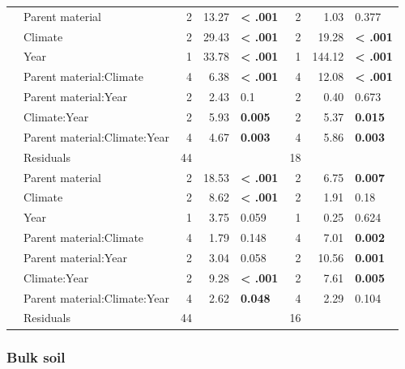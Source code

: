 \documentclass[english,man,floatsintext]{apa6}
\begin{document}
\begin{longtable}[t]{llrrlrrl}
\endfoot
\bottomrule
\endlastfoot
 & Parent material & 2 & 13.27 & \textbf{< .001} & 2 & 1.03 & 0.377\\
\nopagebreak
 & Climate & 2 & 29.43 & \textbf{< .001} & 2 & 19.28 & \textbf{< .001}\\
\nopagebreak
 & Year & 1 & 33.78 & \textbf{< .001} & 1 & 144.12 & \textbf{< .001}\\
\nopagebreak
 & Parent material:Climate & 4 & 6.38 & \textbf{< .001} & 4 & 12.08 & \textbf{< .001}\\
\nopagebreak
 & Parent material:Year & 2 & 2.43 & 0.1 & 2 & 0.40 & 0.673\\
\nopagebreak
 & Climate:Year & 2 & 5.93 & \textbf{0.005} & 2 & 5.37 & \textbf{0.015}\\
\nopagebreak
 & Parent material:Climate:Year & 4 & 4.67 & \textbf{0.003} & 4 & 5.86 & \textbf{0.003}\\
\nopagebreak
\multirow[t]{-8}{*}{\raggedright\arraybackslash 0-10cm} & Residuals & 44 &  &  & 18 &  & \\
\cmidrule{1-8}\pagebreak[0]
 & Parent material & 2 & 18.53 & \textbf{< .001} & 2 & 6.75 & \textbf{0.007}\\
\nopagebreak
 & Climate & 2 & 8.62 & \textbf{< .001} & 2 & 1.91 & 0.18\\
\nopagebreak
 & Year & 1 & 3.75 & 0.059 & 1 & 0.25 & 0.624\\
\nopagebreak
 & Parent material:Climate & 4 & 1.79 & 0.148 & 4 & 7.01 & \textbf{0.002}\\
\nopagebreak
 & Parent material:Year & 2 & 3.04 & 0.058 & 2 & 10.56 & \textbf{0.001}\\
\nopagebreak
 & Climate:Year & 2 & 9.28 & \textbf{< .001} & 2 & 7.61 & \textbf{0.005}\\
\nopagebreak
 & Parent material:Climate:Year & 4 & 2.62 & \textbf{0.048} & 4 & 2.29 & 0.104\\
\nopagebreak
\multirow[t]{-8}{*}{\raggedright\arraybackslash 20-30cm} & Residuals & 44 &  &  & 16 &  & \\*
\end{longtable}
\endgroup{}

\hypertarget{bulk-soil-1}{%
\subsubsection{Bulk soil}\label{bulk-soil-1}}
\end{document}
